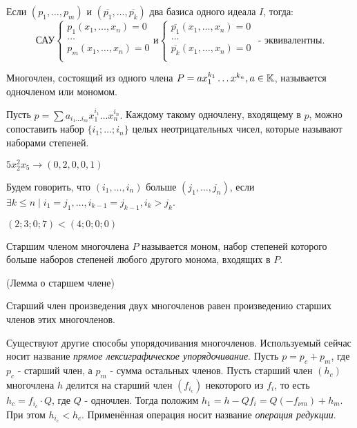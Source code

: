 \utv Если $(p_1,\ldots,p_m)$ и $(\overline{p_1},\ldots,\overline{p_k})$ два базиса одного идеала $I$, тогда:
\begin{equation*}
	\text{САУ}
	\begin{cases}
	   	p_1(x_1,\ldots,x_n) = 0\\
		\ldots\\
	   	p_m(x_1,\ldots,x_n) = 0\\
	\end{cases}
\text{и}
	\begin{cases}
	   	\overline{p_1}(x_1,\ldots,x_n) = 0\\
		\ldots\\
	   	\overline{p_k}(x_1,\ldots,x_n) = 0\\
	\end{cases}
\text{ - эквивалентны.}
\end{equation*}

\opr Многочлен, состоящий из одного члена $P = ax_1^{k_1}\ldots x^{k_n}, a \in \mathbb{K}$, называется одночленом или мономом.

Пусть $p = \sum a_{i_1 \ldots i_m}x_1^{i_1}\ldots x_n^{i_n}.$ Каждому такому одночлену, входящему в $p$, можно сопоставить набор $\{i_1;\ldots;i_n\}$  целых неотрицательных чисел, которые называют наборами степеней.

\example $5x_2^2x_5 \rightarrow (0,2,0,0,1)$

\opr Будем говорить, что $(i_1,\ldots,i_n)$ больше $(j_1,\ldots,j_n)$, если $\exists k \le n \mid i_1 = j_1, \ldots, i_{k-1} = j_{k-1},i_k > j_k$.

\example $(2;3;0;7) < (4;0;0;0)$

\opr Старшим членом многочлена $P$ называется моном, набор степеней которого больше наборов степеней любого другого монома, входящих в $P$.

\lem (Лемма о старшем члене)

Старший член произведения двух многочленов равен произведению старших членов этих многочленов.

\note Существуют другие способы упорядочивания многочленов. Используемый сейчас носит название \emph{прямое лексиграфическое упорядочивание}. Пусть $p = p_c + p_m$, где $p_c$ - старший член, а  $p_m$ - сумма остальных членов. Пусть старший член $(h_c)$ многочлена $h$ делится на старший член $(f_{i_c})$ некоторого из $f_i$, то есть $h_c = f_{i_c} \cdot Q$, где $Q$ - одночлен. Тогда положим $h_1 = h - Qf_i = Q(-f_{\nu m}) + h_m$. При этом $h_{i_c} < h_c$. Применённая операция носит название \emph{операция редукции}.

